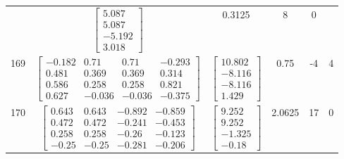 \documentclass[a4paper,12pt]{article}
\begin{document}
\begin{tabular}{c c c c c c}
&
$\begin{bmatrix} 5.087 \\ 5.087 \\ -5.192 \\ 3.018 \end{bmatrix}$
&
0.3125
&
8
&
0
\\
169
&
$\begin{bmatrix} -0.182 & 0.71 & 0.71 & -0.293 \\ 0.481 & 0.369 & 0.369 & 0.314 \\ 0.586 & 0.258 & 0.258 & 0.821 \\ 0.627 & -0.036 & -0.036 & -0.375 \end{bmatrix}$
&
$\begin{bmatrix} 10.802 \\ -8.116 \\ -8.116 \\ 1.429 \end{bmatrix}$
&
0.75
&
-4
&
4
\\
170
&
$\begin{bmatrix} 0.643 & 0.643 & -0.892 & -0.859 \\ 0.472 & 0.472 & -0.241 & -0.453 \\ 0.258 & 0.258 & -0.26 & -0.123 \\ -0.25 & -0.25 & -0.281 & -0.206 \end{bmatrix}$
&
$\begin{bmatrix} 9.252 \\ 9.252 \\ -1.325 \\ -0.18 \end{bmatrix}$
&
2.0625
&
17
&
0
\\
\end{tabular} \egroup \newpage
\end{document}
